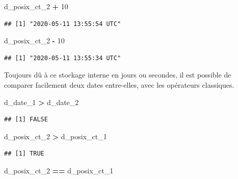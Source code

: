 \documentclass[
  11pt,
]{book}
\newenvironment{Shaded}{\begin{snugshade}}{\end{snugshade}}
\newcommand{\DecValTok}[1]{\textcolor[rgb]{0.00,0.00,0.81}{#1}}
\newcommand{\NormalTok}[1]{#1}
\newcommand{\OperatorTok}[1]{\textcolor[rgb]{0.81,0.36,0.00}{\textbf{#1}}}
\newcommand{\StringTok}[1]{\textcolor[rgb]{0.31,0.60,0.02}{#1}}
\numberwithin{equation}{section}
\numberwithin{countremarque}{section}
\begin{document}
\begin{Shaded}
\begin{Highlighting}[]
\NormalTok{d\_posix\_ct\_}\DecValTok{2} \OperatorTok{+}\StringTok{ }\DecValTok{10}
\end{Highlighting}
\end{Shaded}

\begin{lstlisting}
## [1] "2020-05-11 13:55:54 UTC"
\end{lstlisting}

\begin{Shaded}
\begin{Highlighting}[]
\NormalTok{d\_posix\_ct\_}\DecValTok{2} \OperatorTok{{-}}\StringTok{ }\DecValTok{10}
\end{Highlighting}
\end{Shaded}

\begin{lstlisting}
## [1] "2020-05-11 13:55:34 UTC"
\end{lstlisting}

Toujours dû à ce stockage interne en jours ou secondes, il est possible de comparer facilement deux dates entre-elles, avec les opérateurs classiques.

\begin{Shaded}
\begin{Highlighting}[]
\NormalTok{d\_date\_}\DecValTok{1} \OperatorTok{\textgreater{}}\StringTok{ }\NormalTok{d\_date\_}\DecValTok{2}
\end{Highlighting}
\end{Shaded}

\begin{lstlisting}
## [1] FALSE
\end{lstlisting}

\begin{Shaded}
\begin{Highlighting}[]
\NormalTok{d\_posix\_ct\_}\DecValTok{2} \OperatorTok{\textgreater{}}\StringTok{ }\NormalTok{d\_posix\_ct\_}\DecValTok{1}
\end{Highlighting}
\end{Shaded}

\begin{lstlisting}
## [1] TRUE
\end{lstlisting}

\begin{Shaded}
\begin{Highlighting}[]
\NormalTok{d\_posix\_ct\_}\DecValTok{2} \OperatorTok{==}\StringTok{ }\NormalTok{d\_posix\_ct\_}\DecValTok{1}
\end{Highlighting}
\end{Shaded}
\end{document}
